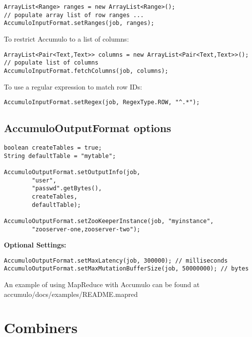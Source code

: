 \small
\begin{verbatim}
ArrayList<Range> ranges = new ArrayList<Range>();
// populate array list of row ranges ...
AccumuloInputFormat.setRanges(job, ranges);
\end{verbatim}
\normalsize

To restrict Accumulo to a list of columns:

\small
\begin{verbatim}
ArrayList<Pair<Text,Text>> columns = new ArrayList<Pair<Text,Text>>();
// populate list of columns
AccumuloInputFormat.fetchColumns(job, columns);
\end{verbatim}
\normalsize

To use a regular expression to match row IDs:

\small
\begin{verbatim}
AccumuloInputFormat.setRegex(job, RegexType.ROW, "^.*");
\end{verbatim}
\normalsize

\subsection{AccumuloOutputFormat options}

\small
\begin{verbatim}
boolean createTables = true;
String defaultTable = "mytable";

AccumuloOutputFormat.setOutputInfo(job,
        "user",
        "passwd".getBytes(),
        createTables,
        defaultTable);

AccumuloOutputFormat.setZooKeeperInstance(job, "myinstance",
        "zooserver-one,zooserver-two");
\end{verbatim}

\Large
\textbf{Optional Settings:}
\normalsize

\small
\begin{verbatim}
AccumuloOutputFormat.setMaxLatency(job, 300000); // milliseconds
AccumuloOutputFormat.setMaxMutationBufferSize(job, 50000000); // bytes
\end{verbatim}
\normalsize

An example of using MapReduce with Accumulo can be found at\\
accumulo/docs/examples/README.mapred

\section{Combiners}

